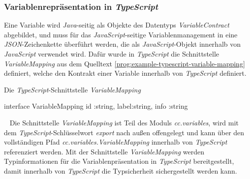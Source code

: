 \subsubsection{Variablenrepräsentation in \emph{TypeScript}}
Eine Variable wird \emph{Java}-seitig als Objekte des Datentyps \emph{VariableContract} abgebildet, und muss für das \emph{JavaScript}-seitige Variablenmanagement in eine \emph{JSON}-Zeichenkette überführt werden, die als \emph{JavaScript}-Objekt innerhalb von \emph{JavaScript} verwendet wird. Dafür wurde in \emph{TypeScript} die Schnittstelle \emph{VariableMapping} aus dem Quelltext \ref{prog:example-typescript-variable-mapping} definiert, welche den Kontrakt einer Variable innerhalb von \emph{TypeScript} definiert.
\begin{program}[h]
\caption{Die \emph{TypeScript}-Schnittstelle \emph{VariableMapping}}
\label{prog:example-typescript-variable-mapping}
\begin{JsCode}
interface VariableMapping {  
    id   :string,       
    label:string,        
    info :string
}
\end{JsCode}
\end{program}
\ \newline
Die Schnittstelle \emph{VariableMapping} ist Teil des Moduls \emph{cc.variables},  wird mit dem \emph{TypeScript}-Schlüsselwort \emph{export} nach außen offengelegt und kann über den vollständigen Pfad \emph{cc.variables.VariableMapping} innerhalb von \emph{TypeScript} referenziert werden. Mit der Schnittstelle \emph{VariableMapping} werden Typinformationen für die Variablenpräsentation in \emph{TypeScript} bereitgestellt, damit innerhalb von \emph{TypeScript} die Typsicherheit sichergestellt werden kann.

